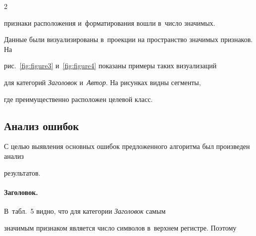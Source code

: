 \begin{multicols}{2}





\noindent


 признаки расположения и~форматирования вошли в~число значимых. 


Данные были визуализированы в~проекции на про\-стран\-ст\-во значимых при\-зна\-ков. На 


рис.~\ref{fig:figure3} и~\ref{fig:figure4} показаны примеры таких визуализаций 


для категорий \textit{Заголовок} и~\textit{Автор}. На рисунках видны сегменты, 


где преимущественно расположен целевой класс.

















    


\vspace*{-6pt}








\subsection{Анализ ошибок}





С целью выявления основных ошибок предложенного алгоритма был произведен анализ 


результатов.





\vspace*{-12pt}





\paragraph*{Заголовок.}


В~табл.~5 видно, что для категории \textit{Заголовок} самым 


значимым признаком является число символов в~верхнем регистре. Поэтому 



\end{multicols}
